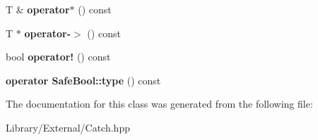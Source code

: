 \begin{DoxyCompactItemize}
\item 
\hypertarget{class_catch_1_1_ptr_a3a4c139032a8bd1bffa553103d5dbfd3}{}T \& {\bfseries operator$\ast$} () const \label{class_catch_1_1_ptr_a3a4c139032a8bd1bffa553103d5dbfd3}

\item 
\hypertarget{class_catch_1_1_ptr_afaa13250d5e0ae5a440726d5e5aa7295}{}T $\ast$ {\bfseries operator-\/$>$} () const \label{class_catch_1_1_ptr_afaa13250d5e0ae5a440726d5e5aa7295}

\item 
\hypertarget{class_catch_1_1_ptr_aea1a99ded6d62423ccb9173fab91b56e}{}bool {\bfseries operator!} () const \label{class_catch_1_1_ptr_aea1a99ded6d62423ccb9173fab91b56e}

\item 
\hypertarget{class_catch_1_1_ptr_a27234c04feec43ffe0fd08e045557448}{}{\bfseries operator Safe\+Bool\+::type} () const \label{class_catch_1_1_ptr_a27234c04feec43ffe0fd08e045557448}

\end{DoxyCompactItemize}


The documentation for this class was generated from the following file\+:\begin{DoxyCompactItemize}
\item 
Library/\+External/Catch.\+hpp\end{DoxyCompactItemize}
